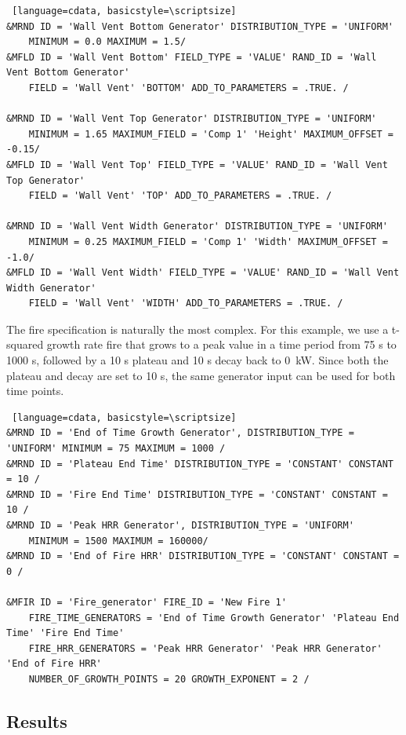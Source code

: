 \documentclass[12pt,twoside]{book}
\begin{document}
\vspace{\baselineskip}
\begin{lstlisting} [language=cdata, basicstyle=\scriptsize]
&MRND ID = 'Wall Vent Bottom Generator' DISTRIBUTION_TYPE = 'UNIFORM'
	MINIMUM = 0.0 MAXIMUM = 1.5/
&MFLD ID = 'Wall Vent Bottom' FIELD_TYPE = 'VALUE' RAND_ID = 'Wall Vent Bottom Generator'
	FIELD = 'Wall Vent' 'BOTTOM' ADD_TO_PARAMETERS = .TRUE. /

&MRND ID = 'Wall Vent Top Generator' DISTRIBUTION_TYPE = 'UNIFORM'
	MINIMUM = 1.65 MAXIMUM_FIELD = 'Comp 1' 'Height' MAXIMUM_OFFSET = -0.15/
&MFLD ID = 'Wall Vent Top' FIELD_TYPE = 'VALUE' RAND_ID = 'Wall Vent Top Generator'
	FIELD = 'Wall Vent' 'TOP' ADD_TO_PARAMETERS = .TRUE. /

&MRND ID = 'Wall Vent Width Generator' DISTRIBUTION_TYPE = 'UNIFORM'
    MINIMUM = 0.25 MAXIMUM_FIELD = 'Comp 1' 'Width' MAXIMUM_OFFSET = -1.0/
&MFLD ID = 'Wall Vent Width' FIELD_TYPE = 'VALUE' RAND_ID = 'Wall Vent Width Generator'
	FIELD = 'Wall Vent' 'WIDTH' ADD_TO_PARAMETERS = .TRUE. /
\end{lstlisting}

The fire specification is naturally the most complex. For this example, we use a t-squared growth rate fire that grows to a peak value in a time period from 75 s to 1000 s, followed by a 10 s plateau and 10 s decay back to 0~kW. Since both the plateau and decay are set to 10 s, the same generator input can be used for both time points.
\vspace{\baselineskip}
\begin{lstlisting} [language=cdata, basicstyle=\scriptsize]
&MRND ID = 'End of Time Growth Generator', DISTRIBUTION_TYPE = 'UNIFORM' MINIMUM = 75 MAXIMUM = 1000 /
&MRND ID = 'Plateau End Time' DISTRIBUTION_TYPE = 'CONSTANT' CONSTANT = 10 /
&MRND ID = 'Fire End Time' DISTRIBUTION_TYPE = 'CONSTANT' CONSTANT = 10 /
&MRND ID = 'Peak HRR Generator', DISTRIBUTION_TYPE = 'UNIFORM'
	MINIMUM = 1500 MAXIMUM = 160000/
&MRND ID = 'End of Fire HRR' DISTRIBUTION_TYPE = 'CONSTANT' CONSTANT = 0 /

&MFIR ID = 'Fire_generator' FIRE_ID = 'New Fire 1'
	FIRE_TIME_GENERATORS = 'End of Time Growth Generator' 'Plateau End Time' 'Fire End Time'
	FIRE_HRR_GENERATORS = 'Peak HRR Generator' 'Peak HRR Generator' 'End of Fire HRR'
	NUMBER_OF_GROWTH_POINTS = 20 GROWTH_EXPONENT = 2 /
\end{lstlisting}

\subsection{Results}
\end{document}
